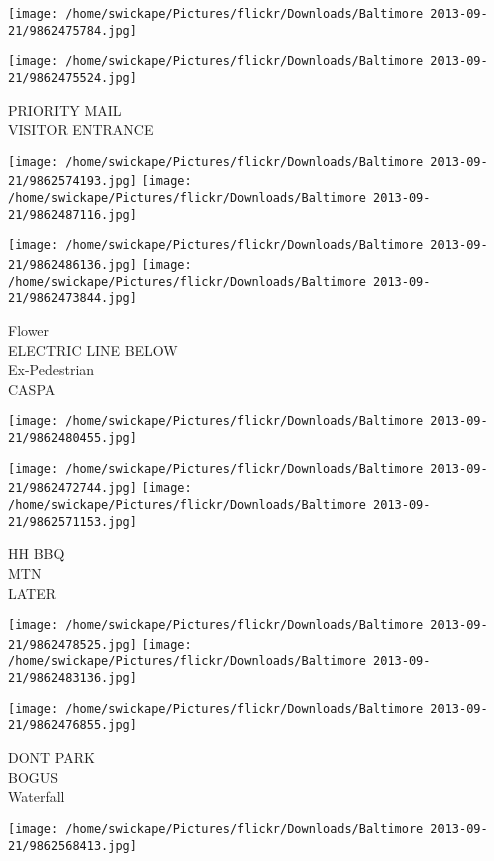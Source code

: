 \documentclass[10pt,letterpaper]{article}
\begin{document}
\texttt{[image: /home/swickape/Pictures/flickr/Downloads/Baltimore 2013-09-21/9862475784.jpg]}

\vspace{0.25in}
\texttt{[image: /home/swickape/Pictures/flickr/Downloads/Baltimore 2013-09-21/9862475524.jpg]}

PRIORITY MAIL\\
VISITOR ENTRANCE
\pagebreak

\texttt{[image: /home/swickape/Pictures/flickr/Downloads/Baltimore 2013-09-21/9862574193.jpg]}
\texttt{[image: /home/swickape/Pictures/flickr/Downloads/Baltimore 2013-09-21/9862487116.jpg]}

\texttt{[image: /home/swickape/Pictures/flickr/Downloads/Baltimore 2013-09-21/9862486136.jpg]}
\texttt{[image: /home/swickape/Pictures/flickr/Downloads/Baltimore 2013-09-21/9862473844.jpg]}

Flower\\
ELECTRIC LINE BELOW\\
Ex{-}Pedestrian\\
CASPA
\pagebreak

\texttt{[image: /home/swickape/Pictures/flickr/Downloads/Baltimore 2013-09-21/9862480455.jpg]}

\vspace{0.25in}
\texttt{[image: /home/swickape/Pictures/flickr/Downloads/Baltimore 2013-09-21/9862472744.jpg]}
\texttt{[image: /home/swickape/Pictures/flickr/Downloads/Baltimore 2013-09-21/9862571153.jpg]}

HH BBQ\\
MTN\\
LATER
\pagebreak

\texttt{[image: /home/swickape/Pictures/flickr/Downloads/Baltimore 2013-09-21/9862478525.jpg]}
\texttt{[image: /home/swickape/Pictures/flickr/Downloads/Baltimore 2013-09-21/9862483136.jpg]}

\vspace{0.25in}
\texttt{[image: /home/swickape/Pictures/flickr/Downloads/Baltimore 2013-09-21/9862476855.jpg]}

DONT PARK\\
BOGUS\\
Waterfall
\pagebreak

\texttt{[image: /home/swickape/Pictures/flickr/Downloads/Baltimore 2013-09-21/9862568413.jpg]}
\end{document}
